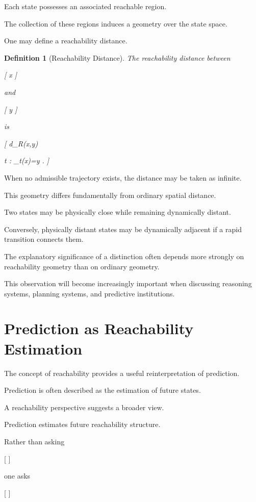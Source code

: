 \documentclass[11pt,oneside,openany]{book}
\newtheorem{definition}{Definition}[chapter] \newtheorem{theorem}{Theorem}[chapter] \newtheorem{proposition}{Proposition}[chapter] \newtheorem{lemma}{Lemma}[chapter] \newtheorem{corollary}{Corollary}[chapter] \newtheorem{remark}{Remark}[chapter]
\begin{document}
Each state possesses an associated reachable region.

The collection of these regions induces a geometry over the state space.

One may define a reachability distance.

\begin{definition}[Reachability Distance]

The reachability distance between

[
x
]

and

[
y
]

is

[
d_R(x,y)

\inf
{
t
:
\Phi_t(x)=y
}.
]

\end{definition}

When no admissible trajectory exists, the distance may be taken as infinite.

This geometry differs fundamentally from ordinary spatial distance.

Two states may be physically close while remaining dynamically distant.

Conversely, physically distant states may be dynamically adjacent if a rapid transition connects them.

The explanatory significance of a distinction often depends more strongly on reachability geometry than on ordinary geometry.

This observation will become increasingly important when discussing reasoning systems, planning systems, and predictive institutions.

\section{Prediction as Reachability Estimation}

The concept of reachability provides a useful reinterpretation of prediction.

Prediction is often described as the estimation of future states.

A reachability perspective suggests a broader view.

Prediction estimates future reachability structure.

Rather than asking

[
]

one asks

[
]
\end{document}
